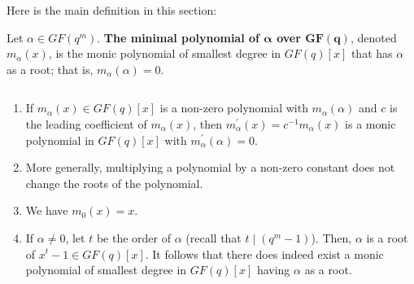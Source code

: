 Here is the main definition in this section:
\begin{defbox}
    \begin{definition}
        Let $ \alpha\in GF(q^m) $. \textbf{The minimal polynomial
            of $ \bm{\alpha} $ over $ \bm{GF(q)} $}, denoted $ m_\alpha(x) $, is
        the monic polynomial of smallest degree in $ GF(q)[x] $ that
        has $ \alpha $ as a root; that is, $ m_\alpha(\alpha)=0 $.
    \end{definition}
\end{defbox}
\begin{remark} $ \; $
    \begin{enumerate}[label=(\arabic*)]
        \item If $ m_\alpha(x)\in GF(q)[x] $ is a non-zero polynomial with $ m_\alpha(\alpha) $
              and $ c $ is the leading coefficient of $ m_\alpha(x) $, then
              $ m_\alpha^\prime(x)=c^{-1}m_\alpha(x) $ is a monic polynomial in $ GF(q)[x] $
              with $ m_\alpha^\prime(\alpha)=0 $.
        \item More generally, multiplying a polynomial by a non-zero constant does not change
              the roots of the polynomial.
        \item We have $ m_0(x)=x $.
        \item If $ \alpha\neq 0 $, let $ t $ be the order of $ \alpha $
              (recall that $ t\mid (q^m-1) $). Then, $ \alpha $ is a root of $ x^t-1\in GF(q)[x] $.
              It follows that there does indeed exist a monic polynomial of smallest degree in $ GF(q)[x] $
              having $ \alpha $ as a root.
    \end{enumerate}
\end{remark}

